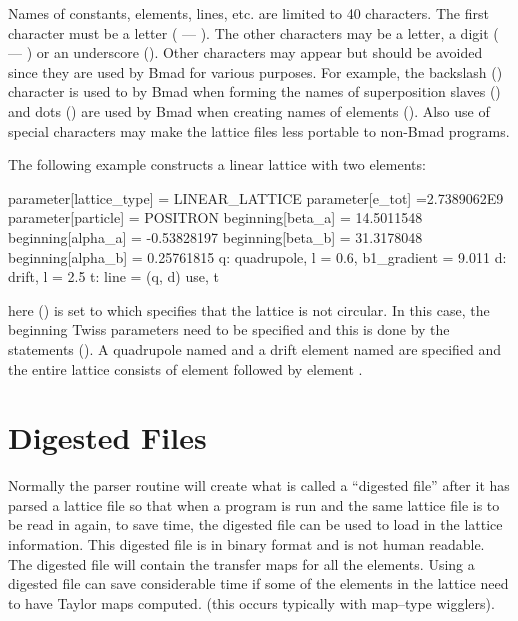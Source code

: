 Names of constants, elements, lines, etc. are limited to 40
characters. The first character must be a letter ( --- ).
The other characters may be a letter, a digit ( --- ) or
an underscore (\vn{_}). Other characters may appear but should be avoided
since they are used by Bmad for various purposes. For example, the 
backslash (\vn{\B}) character is used to by Bmad when forming the names of
superposition slaves () and dots () are used by Bmad 
when creating names of  elements (). Also use of
special characters may make the lattice files less portable to non-Bmad programs.

The following example constructs a linear lattice with two elements: 
\begin{example}
  parameter[lattice_type] = LINEAR_LATTICE
  parameter[e_tot] =2.7389062E9
  parameter[particle] = POSITRON
  beginning[beta_a] = 14.5011548
  beginning[alpha_a] = -0.53828197
  beginning[beta_b] = 31.3178048
  beginning[alpha_b] = 0.25761815
  q: quadrupole, l = 0.6, b1_gradient = 9.011
  d: drift, l = 2.5
  t: line = (q, d)
  use, t 
\end{example}
here  () is set to 
which specifies that the lattice is not circular. In this case, the beginning 
Twiss parameters need to be specified and this is done by the 
statements (). A quadrupole named 
and a drift element named  are specified
and the entire lattice consists of element  followed by element .

\section{Digested Files}
\label{s:digested}

Normally the \bmad parser routine will create what is called a
``digested file'' after it has parsed a lattice file so that when a
program is run and the same lattice file is to be read in again, to save
time, the digested file can be used to load in the lattice information.
This digested file is in binary format and is not human readable. The
digested file will contain the transfer maps for all the elements. 
Using a digested file can save considerable time if some of the
elements in the lattice need to have Taylor maps computed.
(this occurs typically with map--type wigglers).


